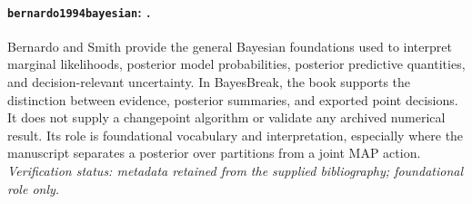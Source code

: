 
\paragraph{\texttt{bernardo1994bayesian}: \citet{bernardo1994bayesian}.}
Bernardo and Smith provide the general Bayesian foundations used to interpret marginal likelihoods, posterior model probabilities, posterior predictive quantities, and decision-relevant uncertainty. In BayesBreak, the book supports the distinction between evidence, posterior summaries, and exported point decisions. It does not supply a changepoint algorithm or validate any archived numerical result. Its role is foundational vocabulary and interpretation, especially where the manuscript separates a posterior over partitions from a joint MAP action. \textit{Verification status: metadata retained from the supplied bibliography; foundational role only.}

